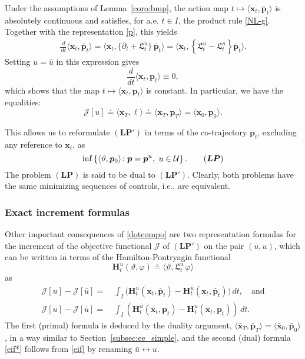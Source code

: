 \documentclass[sn-mathphys-num]{sn-jnl}
\numberwithin{equation}{section}
\theoremstyle{mythm}
\theoremstyle{mydef}
\renewcommand{\phi}{\varphi}
\renewcommand{\d}{\,d}
\begin{document}
Under the assumptions of Lemma~\ref{coro:bmp}, the action map $t \mapsto \langle \bm{x}_t, \bar{\bm{p}}_t \rangle$ is absolutely continuous and satisfies, for a.e. $t \in I$, the product rule \eqref{NL-g}. Together with the representation \eqref{p}, this yields
\begin{align}
\frac{\d}{\d{t}} \langle \bm{x}_t, \bar{\bm{p}}_t \rangle = \big\langle \bm{x}_t, \{\partial_t + \mathfrak{L}_t^u\} \, \bar{\bm{p}}_t \big\rangle = \big\langle \bm{x}_t, \left\{\mathfrak{L}_t^u - \mathfrak{L}_t^{\bar u}\right\} \bar{\bm{p}}_t \big\rangle.
\label{dotcompo}
\end{align}
Setting $u = \bar{u}$ in this expression gives
\[
\frac{d}{dt} \langle \bm{x}_t, \bm{p}_t \rangle \equiv 0,
\]
which shows that the map $t \mapsto \langle \bm{x}_t, \bm{p}_t \rangle$ is constant. In particular, we have the equalities:
\[
\mathcal{J}[u] \doteq \langle \bm{x}_T, \ell \rangle \doteq \langle \bm{x}_T, \bm{p}_T \rangle = \langle \bm{x}_0, \bm{p}_0 \rangle.
\]

This allows us to reformulate $(\bm{LP}')$ in terms of the co-trajectory $\bm{p}_t$, excluding any reference to $\bm{x}_t$, as
\[
\inf\left\{\langle \vartheta, \bm{p}_0 \rangle \colon \bm{p} = \bm{p}^u, \ u \in \mathcal{U} \right\}. \tag{${\bm{LP}}$}
\]
The problem $(\bm{LP})$ is said to be dual to $(\bm{LP}')$. Clearly, both problems have the same minimizing sequences of controls, i.e., are equivalent. 

\subsubsection{Exact increment formulas}\label{sec:imp}

Other important consequences of \eqref{dotcompo} are two representation formulas for the increment of the objective functional $\mathcal J$ of \((\bm{LP}')\) on the pair $(\bar u, u)$, which can be written in terms of the Hamilton-Pontryagin functional 
\[
\bm H_t^u(\vartheta,\phi) \doteq \langle \vartheta, \mathfrak L_t^u\, \phi\rangle
\] as
\begin{align}
    \mathcal J[u] - \mathcal J[\bar u]  = & \  
    \int_I \big(\bm H_t^u(\bm x_t,  \bar{\bm p}_t) - \bm H_t^{\bar u}(\bm x_t,  \bar{\bm p}_t)\big) \d t,\label{eif} \quad  \text{and}\\
    \mathcal J[u] - \mathcal J[\bar u]  = & \ 
    \int_I \left(\bm H_t^{\bar u}(\bar{\bm x}_t,  {\bm p}_t) - \bm H_t^u(\bar{\bm x}_t,  {\bm p}_t)\right) \d t.\label{eif*}
\end{align}
The first (primal) formula is deduced by the duality argument, $\langle \bar{\bm x}_T, \bar{\bm p}_T\rangle = \langle \bar{\bm x}_0, \bar{\bm p}_0\rangle$, in a way similar to Section~\ref{subsec:ee_simple}, 
and the second (dual) formula \eqref{eif*} follows from  \eqref{eif}  by renaming $\bar u \leftrightarrow u$. 
\end{document}
